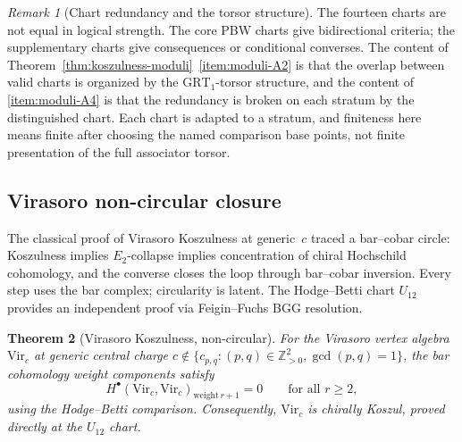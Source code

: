 \documentclass[11pt,reqno]{amsart}
\newtheorem{theorem}{Theorem}[section]
\theoremstyle{definition}
\theoremstyle{remark}
\newtheorem{remark}[theorem]{Remark}
\newcommand{\Vir}{\mathrm{Vir}}
\newcommand{\bZ}{\mathbb{Z}}
\newcommand{\Etwo}{E_2}
\numberwithin{equation}{section}
\begin{document}
\begin{remark}[Chart redundancy and the torsor structure]
\label{rem:chart-redundancy}
The fourteen charts are not equal in logical strength. The core
PBW charts give bidirectional criteria; the supplementary charts
give consequences or conditional converses. The content of
Theorem~\ref{thm:koszulness-moduli}~\ref{item:moduli-A2} is that
the overlap between valid charts is organized by the
$\mathrm{GRT}_1$-torsor structure, and the content of
\ref{item:moduli-A4} is that the redundancy is broken on each
stratum by the distinguished chart. Each chart is adapted to a
stratum, and finiteness here means finite after choosing the
named comparison base points, not finite presentation of the full
associator torsor.
\end{remark}

\subsection{Virasoro non-circular closure}

The classical proof of Virasoro Koszulness at generic~$c$ traced
a bar--cobar circle: Koszulness implies $\Etwo$-collapse implies
concentration of chiral Hochschild cohomology, and the converse
closes the loop through bar--cobar inversion. Every step uses the
bar complex; circularity is latent. The Hodge--Betti chart
$U_{12}$ provides an independent proof via Feigin--Fuchs BGG
resolution.

\begin{theorem}[Virasoro Koszulness, non-circular]
\label{thm:virasoro-koszulness-non-circular}
For the Virasoro vertex algebra $\Vir_c$ at generic central
charge $c \notin \{c_{p,q} : (p,q)\in\bZ^2_{>0},\gcd(p,q)=1\}$,
the bar cohomology weight components satisfy
\[
H^\bullet(\Vir_c, \Vir_c)_{\mathrm{weight}\,r+1} = 0
\qquad \text{for all } r \geq 2,
\]
using the Hodge--Betti comparison. Consequently,
$\Vir_c$ is chirally Koszul, proved directly at the $U_{12}$
chart.
\end{theorem}
\end{document}
